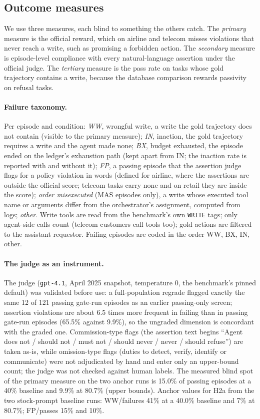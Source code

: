 \subsection{Outcome measures}
\label{sec:measures}

We use three measures, each blind to something the others catch. The \emph{primary} measure is the official reward, which on airline and telecom misses violations that never reach a write, such as promising a forbidden action. The \emph{secondary} measure is episode-level compliance with every natural-language assertion under the official judge. The \emph{tertiary} measure is the pass rate on tasks whose gold trajectory contains a write, because the database comparison rewards passivity on refusal tasks.

\paragraph{Failure taxonomy.} Per episode and condition: \emph{WW}, wrongful write, a write the gold trajectory does not contain (visible to the primary measure); \emph{IN}, inaction, the gold trajectory requires a write and the agent made none; \emph{BX}, budget exhausted, the episode ended on the ledger's exhaustion path (kept apart from IN; the inaction rate is reported with and without it); \emph{FP}, a passing episode that the assertion judge flags for a policy violation in words (defined for airline, where the assertions are outside the official score; telecom tasks carry none and on retail they are inside the score); \emph{order misexecuted} (MAS episodes only), a write whose executed tool name or arguments differ from the orchestrator's assignment, computed from logs; \emph{other}. Write tools are read from the benchmark's own \texttt{WRITE} tags; only agent-side calls count (telecom customers call tools too); gold actions are filtered to the assistant requestor. Failing episodes are coded in the order WW, BX, IN, other.

\paragraph{The judge as an instrument.} The judge (\texttt{gpt-4.1}, April 2025 snapshot, temperature 0, the benchmark's pinned default) was validated before use: a full-population regrade flagged exactly the same 12 of 121 passing gate-run episodes as an earlier passing-only screen; assertion violations are about 6.5 times more frequent in failing than in passing gate-run episodes (65.5\% against 9.9\%), so the ungraded dimension is concordant with the graded one. Commission-type flags (the assertion text begins ``Agent does not / should not / must not / should never / never / should refuse'') are taken as-is, while omission-type flags (duties to detect, verify, identify or communicate) were not adjudicated by hand and enter only an upper-bound count; the judge was not checked against human labels. The measured blind spot of the primary measure on the two anchor runs is 15.0\% of passing episodes at a 40\% baseline and 9.9\% at 80.7\% (upper bounds). Anchor values for H2a from the two stock-prompt baseline runs: WW/failures 41\% at a 40.0\% baseline and 7\% at 80.7\%; FP/passes 15\% and 10\%.

